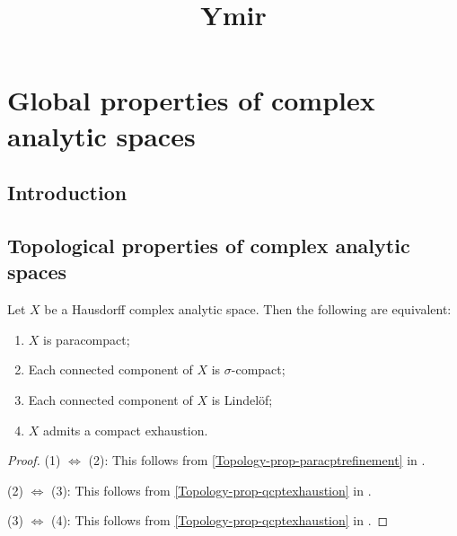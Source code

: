 
\title{Ymir}

\maketitle
\tableofcontents

\chapter*{Global properties of complex analytic spaces}\label{chap-CGlobalProperty}

\section{Introduction}\label{sec-introduction-CGlobalProperty}

\section{Topological properties of complex analytic spaces}

\begin{proposition}\label{prop-paracompactanalyticspace}
    Let $X$ be a Hausdorff complex analytic space. Then the following are equivalent:
    \begin{enumerate}
        \item $X$ is paracompact;
        \item Each connected component of $X$ is $\sigma$-compact;
        \item Each connected component of $X$ is Lindelöf;
        \item $X$ admits a compact exhaustion.
    \end{enumerate}
\end{proposition}
\begin{proof}
    (1) $\Leftrightarrow$ (2): This follows from \cref{Topology-prop-paracptrefinement} in .
    
    (2) $\Leftrightarrow$ (3): This follows from \cref{Topology-prop-qcptexhaustion} in .

    (3) $\Leftrightarrow$ (4): This follows from \cref{Topology-prop-qcptexhaustion} in .
\end{proof}


